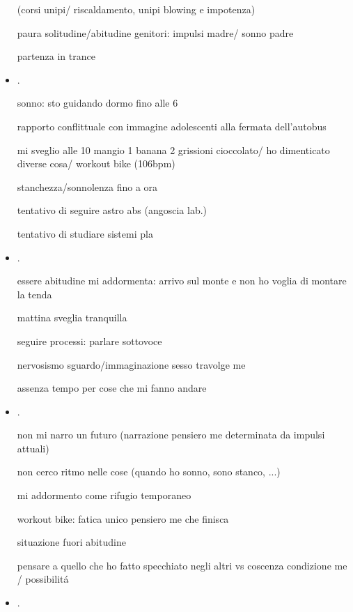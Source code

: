 \begin{itemize}
 (corsi unipi/ riscaldamento, unipi blowing e impotenza)

paura solitudine/abitudine genitori: impulsi madre/ sonno padre

partenza in trance

\item {}.

sonno: sto guidando  dormo fino alle 6

rapporto conflittuale con immagine adolescenti alla fermata dell'autobus 

mi sveglio alle 10 mangio 1 banana 2 grissioni cioccolato/ ho dimenticato diverse cosa/ workout bike (106bpm)

stanchezza/sonnolenza fino a ora

tentativo di seguire astro abs (angoscia lab.) 

tentativo di studiare sistemi pla

\item {}.

essere abitudine mi addormenta: arrivo sul monte e non ho voglia di montare la tenda

mattina sveglia tranquilla

seguire processi: parlare sottovoce


nervosismo sguardo/immaginazione sesso travolge me

assenza tempo per cose che mi fanno andare


\item {}.

non mi narro un futuro (narrazione pensiero me determinata da impulsi attuali)

non cerco ritmo nelle cose (quando ho sonno, sono stanco, ...)

mi addormento come rifugio temporaneo

workout bike: fatica unico pensiero me che finisca

situazione fuori abitudine

pensare a quello che ho fatto specchiato negli altri vs coscenza condizione me / possibilit\'a

\item {}.


\end{itemize}

